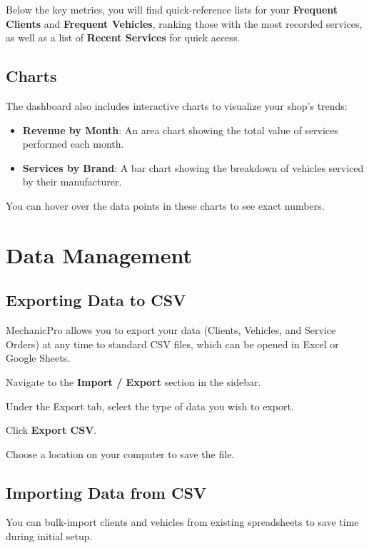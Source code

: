 \documentclass[12pt, a4paper]{report}
\newcommand{\ui}[1]{\textbf{\color{Navy}#1}}
\begin{document}
	Below the key metrics, you will find quick-reference lists for your \ui{Frequent Clients} and \ui{Frequent Vehicles}, ranking those with the most recorded services, as well as a list of \ui{Recent Services} for quick access.
	
	\section{Charts}
	The dashboard also includes interactive charts to visualize your shop's trends:
	\begin{itemize}
		\item \ui{Revenue by Month}: An area chart showing the total value of services performed each month.
		\item \ui{Services by Brand}: A bar chart showing the breakdown of vehicles serviced by their manufacturer.
	\end{itemize}
	You can hover over the data points in these charts to see exact numbers.
	
	\chapter{Data Management}
	
	\section{Exporting Data to CSV}
	MechanicPro allows you to export your data (Clients, Vehicles, and Service Orders) at any time to standard CSV files, which can be opened in Excel or Google Sheets.
	
	\begin{steps}
		\item Navigate to the \ui{Import / Export} section in the sidebar.
		\item Under the Export tab, select the type of data you wish to export.
		\item Click \ui{Export CSV}.
		\item Choose a location on your computer to save the file.
	\end{steps}
	
	\section{Importing Data from CSV}
	You can bulk-import clients and vehicles from existing spreadsheets to save time during initial setup.
	
\end{document}
